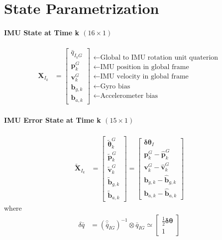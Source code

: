 \documentclass[10pt,letterpaper,fleqn,oneside]{article}
\newcommand{\nl}{\\[0.5em]}
\def\Vec#1{\mathbf{#1}} %
\newcommand{\bbm}{\begin{bmatrix}}
\newcommand{\ebm}{\end{bmatrix}}
\begin{document}
\renewcommand{\headrulewidth}{0pt}
\renewcommand{\footrulewidth}{0pt}



\newpage
{}
\setcounter{page}{1}





\newpage
{}
\setcounter{page}{1}


\section{State Parametrization}
\paragraph{IMU State at Time k $(16\times1)$}
\begin{align}
\Vec{X}_{I_k} &= \bbm \bar{q}_{I_k G} \nl
								\Vec{p}^G_k \nl
								\Vec{v}^G_k \nl
								\Vec{b}_{g,k} \nl
								\Vec{b}_{a,k}
						 \ebm 
						 \begin{array}{l}
						 \leftarrow \text{Global to IMU rotation unit quaterion} \nl
						 \leftarrow \text{IMU position in global frame} \nl
						 \leftarrow \text{IMU velocity in global frame} \nl
						 \leftarrow \text{Gyro bias} \nl
						 \leftarrow \text{Accelerometer bias}
						 \end{array}						 
\end{align}

\paragraph{IMU Error State at Time k $(15\times1)$}
\begin{align}
\widetilde{\Vec{X}}_{I_k} &= 	\bbm \widetilde{\boldsymbol{\theta}}^G_k \nl
										\widetilde{\Vec{p}}^G_k \nl
										\widetilde{\Vec{v}}^G_k \nl
										\widetilde{\Vec{b}}_{g,k} \nl
										\widetilde{\Vec{b}}_{a,k}
								\ebm
								=
								\bbm
										\boldsymbol{\delta\theta}_I \nl
										\Vec{p}^G_k - \hat{\Vec{p}}^G_k \nl
										\Vec{v}^G_k - \hat{\Vec{v}}^G_k \nl
										\Vec{b}_{g,k} - \hat{\Vec{b}}_{g,k} \nl
										\Vec{b}_{a,k} - \hat{\Vec{b}}_{a,k} 
								\ebm
\end{align}
where
\begin{align}
\delta\bar{q} &= \left(\hat{\bar{q}}_{I G}\right)^{-1} \otimes \bar{q}_{I G} \simeq \bbm \frac{1}{2}\boldsymbol{\delta\theta} \nl 1 \ebm
\end{align}
\end{document}

